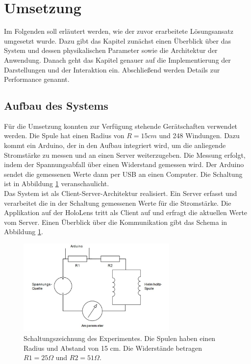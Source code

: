 \section{Umsetzung}
\label{sec-5}
Im Folgenden soll erläutert werden, wie der zuvor erarbeitete Lösungsansatz umgesetzt wurde. Dazu gibt das Kapitel zunächst einen Überblick über das System und dessen physikalischen Parameter sowie die Architektur der Anwendung. Danach geht das Kapitel genauer auf die Implementierung der Darstellungen und der Interaktion ein. Abschließend werden Details zur Performance genannt.

\subsection{Aufbau des Systems}
\label{sec-5-1}
Für die Umsetzung konnten zur Verfügung stehende Gerätschaften verwendet werden. Die Spule hat einen Radius von $R = 15 cm$ und 248 Windungen. Dazu kommt ein Arduino, der in den Aufbau integriert wird, um die anliegende Stromstärke zu messen und an einen Server weiterzugeben. Die Messung erfolgt, indem der Spannungsabfall über einen Widerstand gemessen wird. Der Arduino sendet die gemessenen Werte dann per USB an einen Computer. Die Schaltung ist in Abbildung \ref{img:schaltung} veranschaulicht. \\

Das System ist als Client-Server-Architektur realisiert. Ein Server erfasst und verarbeitet die in der Schaltung gemessenen Werte für die Stromstärke. Die Applikation auf der HoloLens tritt als Client auf und erfragt die aktuellen Werte vom Server. Einen Überblick über die Kommunikation gibt das Schema in Abbildung \ref{img:schaltung}. 
\begin{figure}[H]
	\centering
	\includegraphics[width=0.7\textwidth]{images/schema/schaltung.jpg}
	\caption{Schaltungszeichnung des Experimentes. Die Spulen haben einen Radius und Abstand von 15 cm. Die Widerstände betragen $R1 = 25 \Omega$ und $R2 = 51 \Omega$.}
	\label{img:schaltung}
\end{figure}

